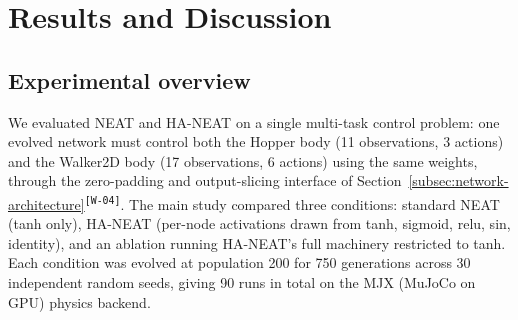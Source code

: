 \documentclass[12pt]{article}
\newcommand{\revID}[1]{\textsuperscript{\scriptsize\texttt{[#1]}}}
\newcommand{\revWrong}[2]{\textcolor{revRed}{#2}\revID{#1}}
\begin{document}


\newpage

\section{Results and Discussion}
\label{sec:results-and-discussion}

\subsection{Experimental overview}
\label{subsec:experimental-overview}
We evaluated NEAT and HA-NEAT on a single multi-task control problem: one evolved network must control both the Hopper body (11 observations, 3 actions) and the Walker2D body (17 observations, 6 actions) using the same weights, \revWrong{W-04}{through the zero-padding and output-slicing interface of Section~\ref{subsec:network-architecture}}.
The main study compared three conditions: standard NEAT (tanh only), HA-NEAT (per-node activations drawn from tanh, sigmoid, relu, sin, identity), and an ablation running HA-NEAT's full machinery restricted to tanh.
Each condition was evolved at population 200 for 750 generations across 30 independent random seeds, giving 90 runs in total on the MJX (MuJoCo on GPU) physics backend.
\end{document}

